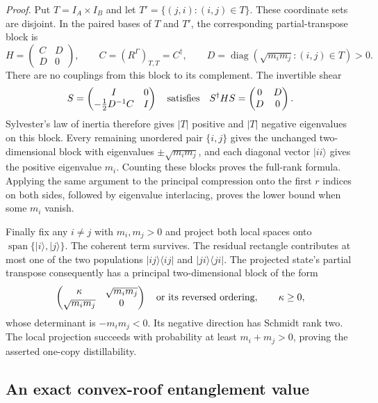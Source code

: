 \emph{Proof.} Put $T=I_A\times I_B$ and let
$T'=\{(j,i):(i,j)\in T\}$. These coordinate sets are disjoint. In the
paired bases of $T$ and $T'$, the corresponding partial-transpose block is
\[
 H=\begin{pmatrix}C&D\\D&0\end{pmatrix},\qquad
 C=(R^\Gamma)_{T,T}=C^\dagger,\qquad
 D=\operatorname{diag}(\sqrt{m_i m_j}:(i,j)\in T)>0.
\]
There are no couplings from this block to its complement. The invertible
shear
\[
 S=\begin{pmatrix}I&0\\-\tfrac12D^{-1}C&I\end{pmatrix}
 \quad\hbox{satisfies}\quad
 S^\dagger H S=\begin{pmatrix}0&D\\D&0\end{pmatrix}.
\]
Sylvester's law of inertia therefore gives $|T|$ positive and $|T|$
negative eigenvalues on this block. Every remaining unordered pair
$\{i,j\}$ gives the unchanged two-dimensional block with eigenvalues
$\pm\sqrt{m_i m_j}$, and each diagonal vector $|ii\rangle$ gives the
positive eigenvalue $m_i$. Counting these blocks proves the full-rank
formula. Applying the same argument to the principal compression onto the
first $r$ indices on both sides, followed by eigenvalue interlacing, proves
the lower bound when some $m_i$ vanish.

Finally fix any $i\ne j$ with $m_i,m_j>0$ and project both local spaces
onto $\operatorname{span}\{|i\rangle,|j\rangle\}$. The coherent term
survives. The residual rectangle contributes at most one of the two
populations $|ij\rangle\langle ij|$ and $|ji\rangle\langle ji|$.
The projected state's partial transpose consequently has a principal
two-dimensional block of the form
\[
 \begin{pmatrix}\kappa&\sqrt{m_i m_j}\\
                 \sqrt{m_i m_j}&0\end{pmatrix}
 \quad\hbox{or its reversed ordering},\qquad \kappa\ge0,
\]
whose determinant is $-m_i m_j<0$. Its negative direction has Schmidt
rank two. The local projection succeeds with probability at least
$m_i+m_j>0$, proving the asserted one-copy distillability.

\subsection{An exact convex-roof entanglement value}

